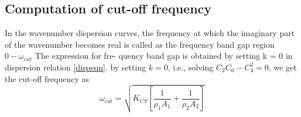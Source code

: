 \subsection*{Computation of cut-off frequency}
In the wavenumber dispersion curves, the frequency at which
the imaginary part of the wavenumber becomes real is called as
the frequency band gap region $0-\omega_{cut}$ The expression for fre-
quency band gap is obtained by setting k = 0 in dispersion relation \eqref{dispeqn}. by setting $k = 0$, i.e., solving $C_2 C_6- C_4^2 =0$, we get the cut-off frequency as\\
\begin{equation}
\omega_{cut}=\sqrt{K_{CS}\left[\dfrac{1}{\rho_1 A_1} + \dfrac{1}{\rho_2 A_2}\right]}
\end{equation}

